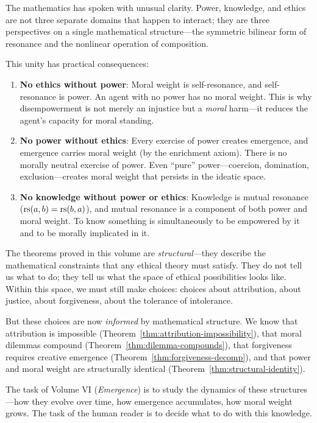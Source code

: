 \begin{remark}
The mathematics has spoken with unusual clarity. Power, knowledge, and
ethics are not three separate domains that happen to interact; they are
three perspectives on a single mathematical structure---the symmetric
bilinear form of resonance and the nonlinear operation of composition.

This unity has practical consequences:
\begin{enumerate}
\item \textbf{No ethics without power}: Moral weight is self-resonance,
and self-resonance is power. An agent with no power has no moral weight.
This is why disempowerment is not merely an injustice but a \emph{moral}
harm---it reduces the agent's capacity for moral standing.
\item \textbf{No power without ethics}: Every exercise of power creates
emergence, and emergence carries moral weight (by the enrichment axiom).
There is no morally neutral exercise of power. Even ``pure'' power---coercion,
domination, exclusion---creates moral weight that persists in the ideatic space.
\item \textbf{No knowledge without power or ethics}: Knowledge is mutual
resonance ($\mathrm{rs}(a,b) = \mathrm{rs}(b,a)$), and mutual resonance is a component of
both power and moral weight. To know something is simultaneously to be
empowered by it and to be morally implicated in it.
\end{enumerate}
\end{remark}

\begin{remark}
The theorems proved in this volume are \emph{structural}---they describe
the mathematical constraints that any ethical theory must satisfy. They do
not tell us what to do; they tell us what the space of ethical possibilities
looks like. Within this space, we must still make choices: choices about
attribution, about justice, about forgiveness, about the tolerance of
intolerance.

But these choices are now \emph{informed} by mathematical structure. We know
that attribution is impossible (Theorem~\ref{thm:attribution-impossibility}),
that moral dilemmas compound (Theorem~\ref{thm:dilemma-compounds}), that
forgiveness requires creative emergence
(Theorem~\ref{thm:forgiveness-decomp}), and that power and moral weight are
structurally identical (Theorem~\ref{thm:structural-identity}).

The task of Volume VI (\emph{Emergence}) is to study the dynamics of these
structures---how they evolve over time, how emergence accumulates, how moral
weight grows. The task of the human reader is to decide what to do with
this knowledge.
\end{remark}
